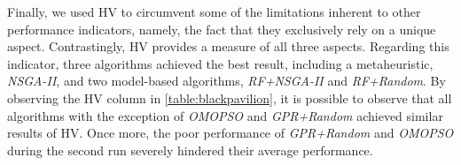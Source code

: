 Finally, we used \ac{HV} to circumvent some of the limitations inherent to other performance indicators, namely, the fact that they exclusively rely on a unique aspect. Contrastingly, \ac{HV} provides a measure of all three aspects. Regarding this indicator, three algorithms achieved the best result, including a metaheuristic, \textit{NSGA-II}, and two model-based algorithms, \textit{RF+NSGA-II} and \textit{RF+Random}. By observing the \ac{HV} column in \cref{table:blackpavilion}, it is possible to observe that all algorithms with the exception of \textit{OMOPSO} and \textit{GPR+Random} achieved similar results of \ac{HV}. Once more, the poor performance of \textit{GPR+Random} and \textit{OMOPSO} during the second run severely hindered their average performance.



